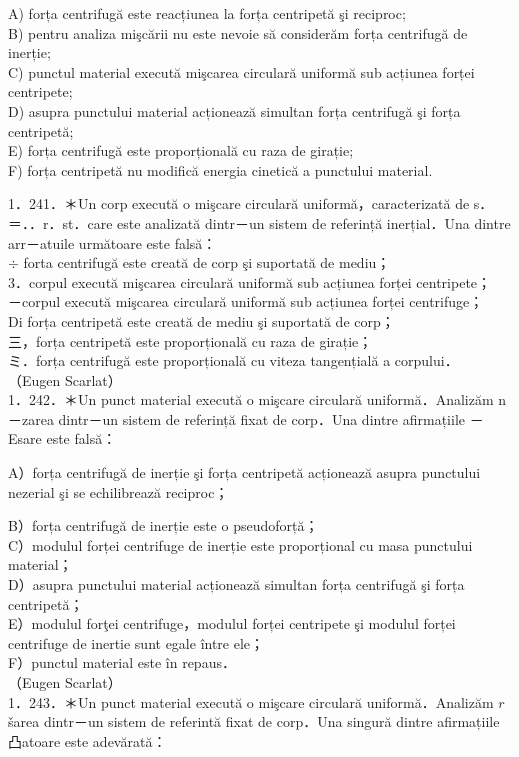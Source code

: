 {\begin{itemize}
A) forța centrifugă este reacțiunea la forța centripetă şi reciproc;\\
B) pentru analiza mişcării nu este nevoie să considerăm forța centrifugă de inerție;\\
C) punctul material execută mişcarea circulară uniformă sub acțiunea forței centripete;\\
D) asupra punctului material acționează simultan forța centrifugă şi forța centripetă;\\
E) forța centrifugă este proporțională cu raza de girație;\\
F) forța centripetă nu modifică energia cinetică a punctului material.
\end{itemize}

1．241．＊Un corp execută o mişcare circulară uniformă，caracterizată de s．＝．．r．st．care este analizată dintr－un sistem de referință inerțial．Una dintre arr－atuile următoare este falsă：\\
$\div$ forta centrifugă este creată de corp şi suportată de mediu；\\
3．corpul execută mişcarea circulară uniformă sub acțiunea forței centripete；\\
－corpul execută mişcarea circulară uniformă sub acțiunea forței centrifuge；\\
Di forța centripetă este creată de mediu şi suportată de corp；\\
三，forța centripetă este proporțională cu raza de girație；\\
ミ．forța centrifugă este proporțională cu viteza tangențială a corpului．\\
（Eugen Scarlat）\\
1．242．＊Un punct material execută o mişcare circulară uniformă．Analizăm n－zarea dintr－un sistem de referință fixat de corp．Una dintre afirmațiile －Esare este falsă：

A）forța centrifugă de inerție şi forța centripetă acționează asupra punctului nezerial şi se echilibrează reciproc；

B）forța centrifugă de inerție este o pseudoforță；\\
C）modulul forței centrifuge de inerție este proporțional cu masa punctului material；\\
D）asupra punctului material acționează simultan forța centrifugă şi forța centripetă；\\
E）modulul forţei centrifuge，modulul forței centripete şi modulul forței centrifuge de inertie sunt egale între ele；\\
F）punctul material este în repaus．\\
（Eugen Scarlat）\\
1．243．＊Un punct material execută o mişcare circulară uniformă．Analizăm $r$ šarea dintr－un sistem de referintă fixat de corp．Una singură dintre afirmațiile凸atoare este adevărată：

}
